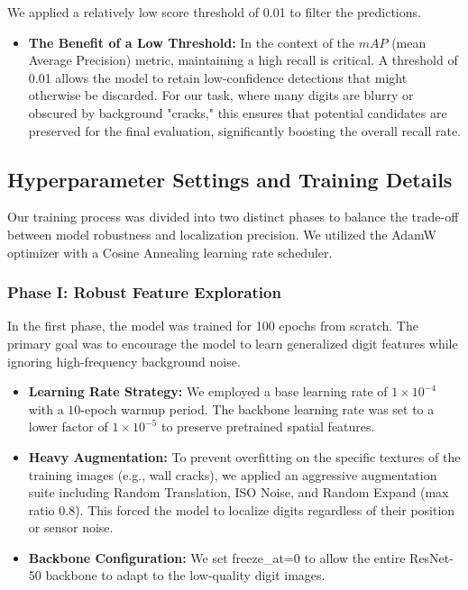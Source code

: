 \documentclass[a4paper]{article} %
\begin{document}
We applied a relatively low score threshold of 0.01 to filter the predictions.

\begin{itemize}
    \item \textbf{The Benefit of a Low Threshold:} In the context of the $mAP$ (mean Average Precision) metric, maintaining a high recall is critical. A threshold of 0.01 allows the model to retain low-confidence detections that might otherwise be discarded. For our task, where many digits are blurry or obscured by background "cracks," this ensures that potential candidates are preserved for the final evaluation, significantly boosting the overall recall rate.
\end{itemize}


\subsection{Hyperparameter Settings and Training Details}

Our training process was divided into two distinct phases to balance the trade-off between model robustness and localization precision. We utilized the AdamW optimizer with a Cosine Annealing learning rate scheduler.

\subsubsection{Phase I: Robust Feature Exploration}

In the first phase, the model was trained for 100 epochs from scratch. The primary goal was to encourage the model to learn generalized digit features while ignoring high-frequency background noise.

\begin{itemize}
    \item \textbf{Learning Rate Strategy:} We employed a base learning rate of $1 \times 10^{-4}$ with a $10$-epoch warmup period. The backbone learning rate was set to a lower factor of $1 \times 10^{-5}$ to preserve pretrained spatial features.
    \item \textbf{Heavy Augmentation:} To prevent overfitting on the specific textures of the training images (e.g., wall cracks), we applied an aggressive augmentation suite including Random Translation, ISO Noise, and Random Expand (max ratio 0.8). This forced the model to localize digits regardless of their position or sensor noise.
    \item \textbf{Backbone Configuration:} We set freeze\_at=0 to allow the entire ResNet-50 backbone to adapt to the low-quality digit images.
\end{itemize}
\end{document}
